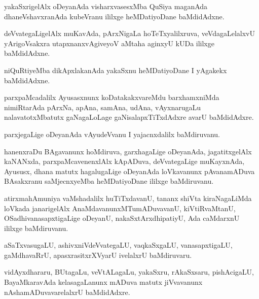 \documentclass{article}
\begin{document}
\begin{mn}
yakaSxrigelAlx oDeyanAda visharxvasesxMba QuSiya maganAda
dhaneVshavxranAda kubeVranu ililxge heMDatiyoDane baMdidAdxne.
\end{mn}

\begin{mn}
deVvategaLigelAlx muKavAda, pArxNigaLa hoTeTxyalilxruva,
veVdagaLelalxvU yArigoVsakxra utapxnanxvAgiveyoV aMtaha aginxyU kUDa
ililxge baMdidAdxne.
\end{mn}

\begin{mn}%
niQuRtiyeMba dikApxlakanAda yakaSxnu heMDatiyoDane I yAgakekx baMdidAdxne.
\end{mn}

\begin{mn}
parxpaMcadalilx Ayusasxnunx koDatakakxvareMdu barxhamxniMda
nimiRtarAda pArxNa, apAna, samAna, udAna, vAyxnarugaLu
nalavatotxMbatutx gaNagaLoLage gaNisalapxTiTxdAdxre avarU baMdidAdxre.
\end{mn}

\begin{mn}
parxjegaLige oDeyanAda vAyudeVvanu I yajacnxdalilx baMdiruvanu.
\end{mn}

\begin{mn}%
hanenxraDu BAgavanunx hoMdiruva, garxhagaLige oDeyanAda,
jagatitxgelAlx kaNANxda, parxpaMcavenenxlAlx kApADuva, deVvategaLige
muKayxnAda, Ayususx, dhana matutx hagalugaLige oDeyanAda loVkavanunx
pAvanamADuva BAsakxranu saMjecnxyeMba heMDatiyoDane ililxge baMdiruvanu.
\end{mn}

\begin{mn}%
atirxmahAmuniya vaMshadalilx huTiTxdavanU, tananx shiVta kiraNagaLiMda
loVkada janarigelAlx AnaMdavanunxMTumADuvavanU, kiVtiRvaMtanU,
OSadhivanasapxtigaLige oDeyanU, nakaSxtArxdhipatiyU, Ada caMdarxnU
ililxge baMdiruvanu.
\end{mn}

\begin{mn}%
aSaTxvasugaLU, ashivxniVdeVvategaLU, vaqkaSxgaLU, vanasapxtigaLU,
gaMdhavaRrU, apasxrasitxrXVyarU ivelalxrU baMdiruvaru.
\end{mn}

\begin{mn}
vidAyxdhararu, BUtagaLu, veVtALagaLu, yakaSxru, rAkaSxsaru,
pishAcigaLU, BayaMkaravAda kelasagaLanunx mADuva matutx jiVvavanunx
nAshamADuvavarelalxrU baMdidAdxre.
\end{mn}
\end{document}
